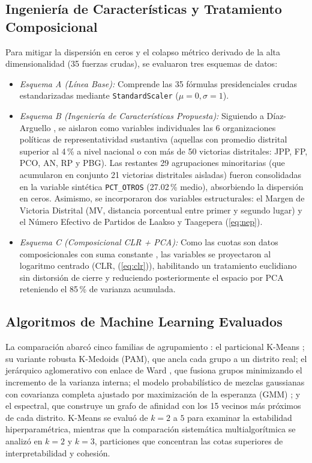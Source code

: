 \documentclass[conference,10pt,letterpaper]{IEEEtran}
\begin{document}
\subsection{Ingeniería de Características y Tratamiento Composicional}

Para mitigar la dispersión en ceros y el colapso métrico derivado de la alta dimensionalidad (35 fuerzas crudas), se evaluaron tres esquemas de datos:
\begin{itemize}
    \item \textit{Esquema A (Línea Base):} Comprende las 35 fórmulas presidenciales crudas estandarizadas mediante \texttt{StandardScaler} ($\mu = 0, \sigma = 1$).
    \item \textit{Esquema B (Ingeniería de Características Propuesta):} Siguiendo a Díaz-Arguello \cite{diaz2025}, se aislaron como variables individuales las 6 organizaciones políticas de representatividad sustantiva (aquellas con promedio distrital superior al 4\,\% a nivel nacional o con más de 50 victorias distritales: JPP, FP, PCO, AN, RP y PBG). Las restantes 29 agrupaciones minoritarias (que acumularon en conjunto 21 victorias distritales aisladas) fueron consolidadas en la variable sintética \texttt{PCT\_OTROS} (27.02\,\% medio), absorbiendo la dispersión en ceros. Asimismo, se incorporaron dos variables estructurales: el Margen de Victoria Distrital (MV, distancia porcentual entre primer y segundo lugar) y el Número Efectivo de Partidos de Laakso y Taagepera (\ref{eq:nep}).
    \item \textit{Esquema C (Composicional CLR + PCA):} Como las cuotas son datos composicionales con suma constante \cite{greenacre2021}, las variables se proyectaron al logaritmo centrado (CLR, (\ref{eq:clr})), habilitando un tratamiento euclidiano sin distorsión de cierre y reduciendo posteriormente el espacio por PCA reteniendo el 85\,\% de varianza acumulada.
\end{itemize}

\subsection{Algoritmos de Machine Learning Evaluados}

La comparación abarcó cinco familias de agrupamiento \cite{rokach2005}: el particional K-Means \cite{hartigan1979}; su variante robusta K-Medoids (PAM), que ancla cada grupo a un distrito real; el jerárquico aglomerativo con enlace de Ward \cite{ward1963}, que fusiona grupos minimizando el incremento de la varianza interna; el modelo probabilístico de mezclas gaussianas con covarianza completa ajustado por maximización de la esperanza (GMM) \cite{dempster1977}; y el espectral, que construye un grafo de afinidad con los 15 vecinos más próximos de cada distrito. K-Means se evaluó de $k = 2$ a $5$ para examinar la estabilidad hiperparamétrica, mientras que la comparación sistemática multialgorítmica se analizó en $k = 2$ y $k = 3$, particiones que concentran las cotas superiores de interpretabilidad y cohesión.
\end{document}
